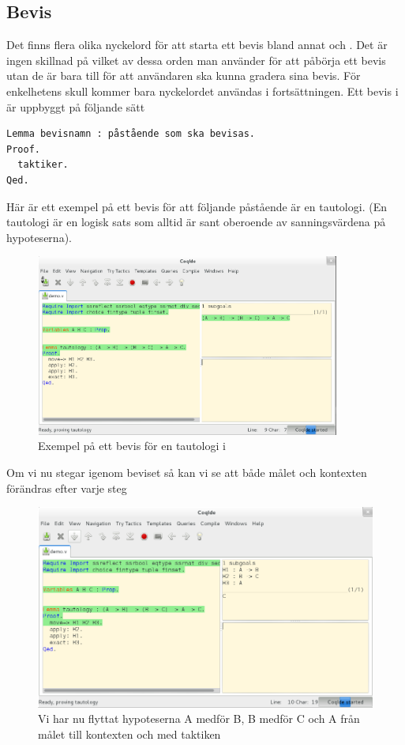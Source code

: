 \subsection{Bevis}
Det finns flera olika nyckelord för att starta ett bevis bland annat
 och . Det är ingen skillnad på vilket av dessa orden man
använder för att påbörja ett bevis utan de är bara till för att användaren ska
kunna gradera sina bevis. För enkelhetens skull kommer bara nyckelordet
 användas i fortsättningen. Ett bevis i \coq är uppbyggt på följande
sätt

\begin{lstlisting}
Lemma bevisnamn : påstående som ska bevisas.
Proof.
  taktiker.
Qed.
\end{lstlisting}

Här är ett exempel på ett bevis för att följande påstående är en tautologi.
(En tautologi är en logisk sats som alltid är sant oberoende av sanningsvärdena
på hypoteserna).


\begin{figure}[H]
  \centering
  \includegraphics[width=100mm]{images/Proof_part1}
  \caption[Exempel på bevis i \coq]
   {Exempel på ett bevis för en tautologi i \coq}
\end{figure}

Om vi nu stegar igenom beviset så kan vi se att både målet och kontexten
förändras efter varje steg

\begin{figure}[H]
  \centering
  \includegraphics[width=150mm]{images/Proof_part2}
  \caption[Bevis i \coq IDE]
   {Vi har nu flyttat hypoteserna A medför B, B medför C och A
    från målet till kontexten och med taktiken }
\end{figure}

